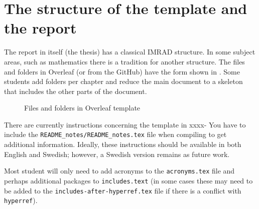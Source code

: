 \section{The structure of the template and the report}
The report in itself (\ie the thesis) has a classical IMRAD structure. In some subject areas, such as mathematics there is a tradition for another structure.
The files and folders in Overleaf (or from the GitHub) have the form shown in . Some students add folders per chapter and reduce the main document to a skeleton that includes the other parts of the document.
\begin{figure}[!ht]
  \begin{center}
  \end{center}
  \caption{Files and folders in Overleaf template}
  \label{fig:overleafFoldersAndFiles}
\end{figure}
\FloatBarrier

There are currently instructions concerning the template in 
{xxxx- You have to include the \texttt{README\_notes/README\_notes.tex} file when compiling to get additional information.}
Ideally, these instructions should be available in both English and Swedish; however, a Swedish version remains as future work.

Most student will only need to add acronyms to the \texttt{acronyms.tex} file and perhaps additional packages to \texttt{includes.text} (in some cases these may need to be added to the \texttt{includes-after-hyperref.tex} file if there is a conflict with \texttt{hyperref}).

